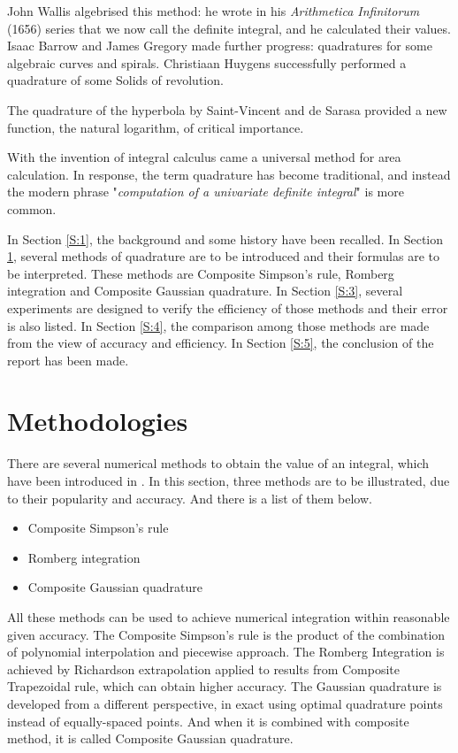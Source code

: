 \documentclass[preprint,12pt]{elsarticle}
\begin{document}
John Wallis algebrised this method: he wrote in his \textit{Arithmetica Infinitorum} (1656) series that we now call the definite integral, and he calculated their values. Isaac Barrow and James Gregory made further progress: quadratures for some algebraic curves and spirals. Christiaan Huygens successfully performed a quadrature of some Solids of revolution.

The quadrature of the hyperbola by Saint-Vincent and de Sarasa provided a new function, the natural logarithm, of critical importance.

With the invention of integral calculus came a universal method for area calculation. In response, the term quadrature has become traditional, and instead the modern phrase "\textit{computation of a univariate definite integral}" is more common.

In Section \ref{S:1}, the background and some history have been recalled. In Section \ref{S:2}, several methods of quadrature are to be introduced and their formulas are to be interpreted. These methods are Composite Simpson's rule, Romberg integration and Composite Gaussian quadrature. In Section \ref{S:3}, several experiments are designed to verify the efficiency of those methods and their error is also listed. In Section \ref{S:4}, the comparison among those methods are made from the view of accuracy and efficiency. In Section \ref{S:5}, the conclusion of the report has been made.

\section{Methodologies}
\label{S:2}

There are several numerical methods to obtain the value of an integral, which have been introduced in \cite{burden:2001na}. In this section, three methods are to be illustrated, due to their popularity and accuracy. And there is a list of them below.

\begin{itemize}
\item Composite Simpson's rule
\item Romberg integration
\item Composite Gaussian quadrature
\end{itemize}

All these methods can be used to achieve numerical integration within reasonable given accuracy. The Composite Simpson's rule is the product of the combination of polynomial interpolation and piecewise approach. The Romberg Integration is achieved by Richardson extrapolation applied to results from Composite Trapezoidal rule, which can obtain higher accuracy. The Gaussian quadrature is developed from a different perspective, in exact using optimal quadrature points instead of equally-spaced points. And when it is combined with composite method, it is called Composite Gaussian quadrature.
\end{document}
